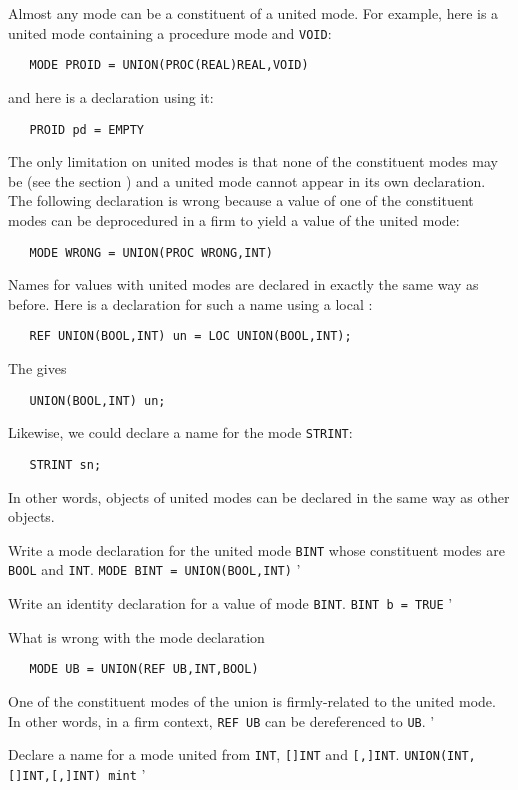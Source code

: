 Almost any mode can be a constituent of a united mode.  For example,
here is a united mode containing a procedure mode and \verb|VOID|:
\begin{verbatim}
   MODE PROID = UNION(PROC(REAL)REAL,VOID)
\end{verbatim}
\noindent
and here is a declaration using it:
\begin{verbatim}
   PROID pd = EMPTY
\end{verbatim}
\noindent
The only limitation on united modes is that none of the constituent
modes may be  (see the section )
and a united mode cannot appear in its own declaration. The following
declaration is wrong because a value of one of the constituent modes
can be deprocedured in a firm  to yield a
value of the united mode:
\begin{verbatim}
   MODE WRONG = UNION(PROC WRONG,INT)
\end{verbatim}

Names for values with united modes are declared in exactly the same way
as before. Here is a declaration for such a name using a local
:
\begin{verbatim}
   REF UNION(BOOL,INT) un = LOC UNION(BOOL,INT);
\end{verbatim}
\noindent
The  gives
\begin{verbatim}
   UNION(BOOL,INT) un;
\end{verbatim}
\noindent
Likewise, we could declare a name for the mode \verb|STRINT|:
\begin{verbatim}
   STRINT sn;
\end{verbatim}
\noindent
In other words, objects of united modes can be declared in the same way
as other objects.

\begin{exercise}
\item Write a mode declaration for the united mode \verb|BINT| whose
constituent modes are \verb|BOOL| and \verb|INT|.
\ans \verb|MODE BINT = UNION(BOOL,INT)|
'
\item Write an identity declaration for a value of mode \verb|BINT|.
\ans \verb|BINT b = TRUE|
'
\item What is wrong with the mode declaration
\begin{verbatim}
   MODE UB = UNION(REF UB,INT,BOOL)
\end{verbatim}
\indent \ans One of the constituent modes of the union is
firmly-related to the united mode. In other words, in a firm context,
\verb|REF UB| can be dereferenced to \verb|UB|.
'
\item Declare a name for a mode united from \verb|INT|, \verb|[]INT| and
\verb|[,]INT|. \ans \verb|UNION(INT,[]INT,[,]INT) mint|
'
\end{exercise}

